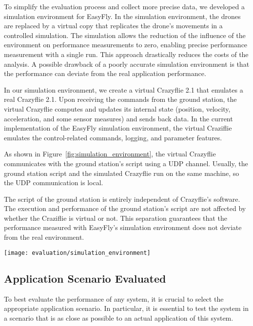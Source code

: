 To simplify the evaluation process and collect more precise data, we developed a simulation environment for EasyFly.
In the simulation environment, the drones are replaced by a virtual copy that replicates the drone's movements in a controlled simulation.
The simulation allows the reduction of the influence of the environment on performance measurements to zero, enabling precise performance measurement with a single run.
This approach drastically reduces the costs of the analysis.
A possible drawback of a poorly accurate simulation environment is that the performance can deviate from the real application performance.

In our simulation environment, we create a virtual Crazyflie 2.1 that emulates a real Crazyflie 2.1.
Upon receiving the commands from the ground station, the virtual Crazyflie computes and updates its internal state (position, velocity, acceleration, and some sensor measures) and sends back data.
In the current implementation of the EasyFly simulation environment, the virtual Craziflie emulates the control-related commands, logging, and parameter features.

As shown in Figure~\ref{fig:simulation_environment}, the virtual Crazyflie communicates with the ground station's script using a UDP channel.
Usually, the ground station script and the simulated Crazyflie run on the same machine, so the UDP communication is local.

The script of the ground station is entirely independent of Crazyflie's software. 
The execution and performance of the ground station's script are not affected by whether the Craziflie is virtual or not.
This separation guarantees that the performance measured with EasyFly's simulation environment does not deviate from the real environment.

\begin{SCfigure}[\sidecaptionrelwidth][h]
    \texttt{[image: evaluation/simulation\_environment]}
    \caption{Structure of EasyFly simulation environment}\label{fig:simulation_environment}
\end{SCfigure}


\subsection{Application Scenario Evaluated}\label{subsec:application_scenario_evaluated}
To best evaluate the performance of any system, it is crucial to select the appropriate application scenario.
In particular, it is essential to test the system in a scenario that is as close as possible to an actual application of this system.

